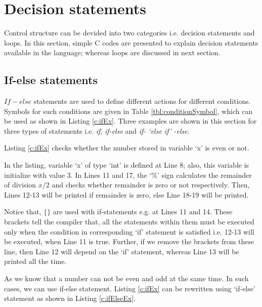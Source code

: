 \section{Decision statements} \label{decisionStatement}
Control structure can be devided into two categories i.e. decision statements and loops. In this section, simple C codes are presented to explain decision statements available in the language; whereas loops are discussed in next section.

\subsection{If-else statements} \label{sec:ifElse}
\textit{$If-else$} statements are used to define different actions for different conditions. Symbols for such conditions are given in Table \ref{tbl:conditionSymbol}, which can be used as shown in Listing \ref{c:ifEx}. Three examples are shown in this section for three types of statements i.e. \textit{if}, \textit{if-else} and \textit{if- `else if' -else}.


\begin{pyExmp}[If statements]
	Listing \ref{c:ifEx} checks whether the number stored in variable `x' is even or not.
\end{pyExmp}

\begin{explanation}
	In the listing, variable `x' of type `int' is defined at Line 8; also, this variable is initialize with value 3. In Lines 11 and 17, the `$\%$' sign calculates the remainder of division $x/2$ and checks whether remainder is zero or not respectively. Then, Lines 12-13 will be printed if remainder is zero, else Line 18-19 will be printed. 
	
	Notice that, $\{ \}$ are used with if-statements e.g. at Lines 11 and 14. These brackets tell the compiler that, all the statements within them must be executed only when the condition in corresponding `if' statement is satisfied i.e. 12-13 will be executed, when Line 11 is true. Further, if we remove the brackets from these line, then Line 12 will depend on the `if' statement, whereas Line 13 will be printed all the time. 
\end{explanation}




 

\begin{pyExmp}
	As we know that a number can not be even and odd at the same time. In such cases, we can use if-else statement. Listing \ref{c:ifEx} can be rewritten using `if-else' statement as shown in Listing \ref{c:ifElseEx}.
\end{pyExmp}

